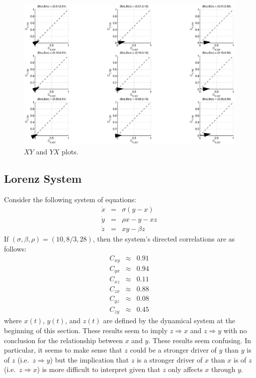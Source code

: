 \documentclass[a4paper,11pt]{article}
\begin{document}
\begin{figure}[h!t]
\centering
\label{fig:ThreePopFig3}
\includegraphics[scale=0.5]{graphics/ThreePopFig3.eps}
\caption{$XY$ and $YX$ plots.}
\end{figure}

\subsection{Lorenz System}
Consider the following system of equations:
\begin{eqnarray*}
\dot{x} &=& \sigma\left(y-x\right)\\
\dot{y} &=& \rho x-y-xz\\
\dot{z} &=& xy - \beta z
\end{eqnarray*}
If $(\sigma,\beta,\rho)=(10,8/3,28)$, then the system's directed correlations are as follows:
\begin{eqnarray*}
C_{xy} &\approx & 0.91\\
C_{yx} &\approx & 0.94\\
C_{xz} &\approx & 0.11\\
C_{zx} &\approx & 0.88\\
C_{yz} &\approx & 0.08\\
C_{zy} &\approx & 0.45
\end{eqnarray*}
where $x(t)$, $y(t)$, and $z(t)$ are defined by the dynamical system at the beginning of this section.  These results seem to imply $z\Rightarrow x$ and $z\Rightarrow y$ with no conclusion for the relationship between $x$ and $y$.  These results seem confusing.  In particular, it seems to make sense that $z$ could be a stronger driver of $y$ than $y$ is of $z$ (i.e.\ $z\Rightarrow y$) but the implication that $z$ is a stronger driver of $x$ than $x$ is of $z$ (i.e.\ $z\Rightarrow x$) is more difficult to interpret given that $z$ only affects $x$ through $y$.
\end{document}
